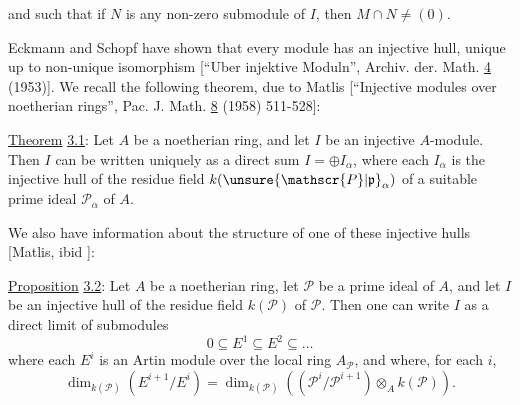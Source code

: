 and such that if $N$ is any non-zero submodule of $I$, then $M\cap N\neq(0)$.

Eckmann and Schopf have shown that every module has an injective hull, unique up to non-unique isomorphism [``Uber injektive Moduln'', Archiv. der. Math. \uline{4} (1953)]. We recall the following theorem, due to Matlis [``Injective modules over noetherian rings'', Pac. J. Math. \uline{8} (1958) 511-528]:

\uline{Theorem} \uline{3.1}: Let $A$ be a noetherian ring, and let $I$ be an injective $A$-module. Then $I$ can be written uniquely as a direct sum $I=\oplus I_\alpha$, where each $I_\alpha$ is the injective hull of the residue field $k(\unsure{\mathscr{P}|\mathfrak{p}}_\alpha)$ of a suitable prime ideal $\mathscr{P}_\alpha$ of $A$.

We also have information about the structure of one of these injective hulls [Matlis, ibid ]:

\uline{Proposition} \uline{3.2}: Let $A$ be a noetherian ring, let $\mathscr{P}$ be a prime ideal of $A$, and let $I$ be an injective hull of the residue field $k(\mathscr{P})$ of $\mathscr{P}$. Then one can write $I$ as a direct limit of submodules
\[
0\subseteq E^1\subseteq E^2\subseteq\ldots
\]
where each $E^i$ is an Artin module over the local ring $A_{\mathscr{P}}$, and where, for each $i$,
\[
\dim_{k(\mathscr{P})}(E^{i+1}/E^i)=\dim_{k(\mathscr{P})}\left((\mathscr{P}^i/\mathscr{P}^{i+1})\otimes_A k(\mathscr{P})\right).
\]

